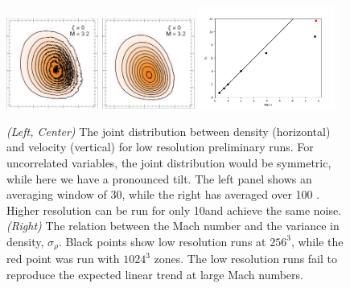 \begin{figure} \begin{center}
\caption[ ]{}
\label{fig.sigma} \end{center} \end{figure}

\begin{figure} \begin{center}
\includegraphics[width=0.27\textwidth]{Joint1.png}
\includegraphics[width=0.27\textwidth]{Joint2.png}
\includegraphics[width=0.40\textwidth]{resolution.png}
\caption[ ]{\emph{(Left, Center)} The joint distribution between density (horizontal) and velocity (vertical) for low resolution preliminary runs.  For uncorrelated variables, the joint distribution would be symmetric, while here we have a pronounced tilt.  The left panel shows an averaging window of 30\tdyn, while the right has averaged over 100 \tdyn. Higher resolution can be run for only 10\tdyn and achieve the same noise.
\emph{(Right)}
The relation between  the Mach number and the
variance in density, $\sigma_\rho$.  Black points show low resolution runs at
$256^3$, while the red point was run with $1024^3$ zones.  The low resolution
runs fail to reproduce the expected linear trend at large Mach numbers.  
}
\label{fig.joint} \end{center} \end{figure}
